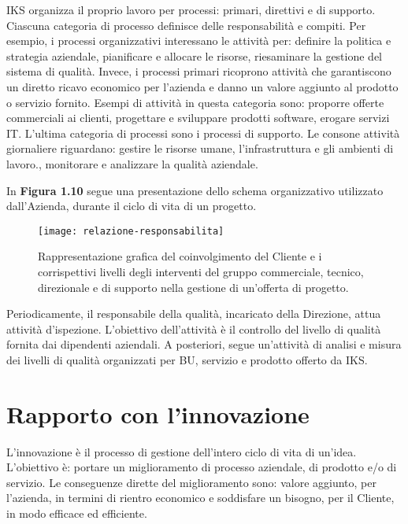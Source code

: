 IKS organizza il proprio lavoro per processi: primari, direttivi e di supporto. 
Ciascuna categoria di processo definisce delle responsabilità e compiti. 
Per esempio, i processi organizzativi interessano le attività per: definire la politica 
e strategia aziendale, pianificare e allocare le risorse, riesaminare la gestione del 
sistema di qualità. Invece, i processi primari ricoprono attività che garantiscono 
un diretto ricavo economico per l'azienda e danno un valore aggiunto al prodotto o 
servizio fornito. Esempi di attività in questa categoria sono: proporre offerte 
commerciali ai clienti, progettare e sviluppare prodotti software, erogare servizi IT. 
L'ultima categoria di processi sono i processi di supporto. Le consone attività giornaliere 
riguardano: gestire le risorse umane, l'infrastruttura 
e gli ambienti di lavoro., monitorare e analizzare la qualità aziendale. 

In \textbf{Figura 1.10} segue una presentazione dello schema organizzativo 
utilizzato dall'Azienda, durante il ciclo di vita di un progetto.

\begin{figure}[htbp]
	\begin{center}
		\texttt{[image: relazione-responsabilita]}
		\caption{Rappresentazione grafica del coinvolgimento del 
			Cliente e i corrispettivi livelli degli interventi del gruppo 
			commerciale, tecnico, direzionale e di supporto nella gestione 
			di un'offerta di progetto.}
	\end{center}
\end{figure}


Periodicamente, il responsabile della qualità, incaricato della Direzione, attua 
attività d'ispezione. L'obiettivo dell'attività è il controllo del livello di qualità
fornita dai dipendenti aziendali. A posteriori, segue un'attività di 
analisi e misura dei livelli di qualità organizzati per BU, servizio e 
prodotto offerto da IKS.




\section{Rapporto con l'innovazione}
L'innovazione è il processo di gestione dell'intero ciclo di vita di un'idea. 
L'obiettivo è: portare un miglioramento di processo aziendale, di prodotto e/o 
di servizio. Le conseguenze dirette del miglioramento sono: valore aggiunto, per 
l'azienda, in termini di rientro economico e soddisfare un 
bisogno, per il Cliente, in modo efficace ed efficiente. 

